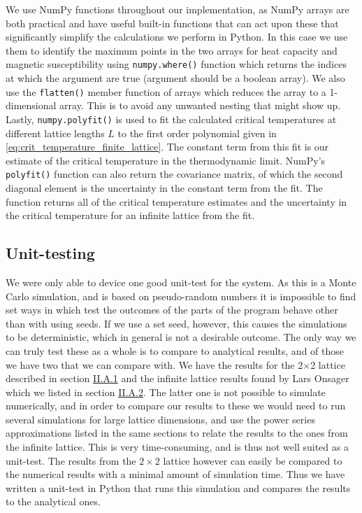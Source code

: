 \documentclass[reprint,english,notitlepage]{revtex4-1}  %
\begin{document}
We use NumPy \citep{numpy} functions throughout our implementation, as NumPy arrays are both practical and have useful built-in functions that can act upon these that significantly simplify the calculations we perform in Python. In this case we use them to identify the maximum points in the two arrays for heat capacity and magnetic susceptibility using \verb+numpy.where()+ function which returns the indices at which the argument are true (argument should be a boolean array). We also use the \verb+flatten()+ member function of arrays which reduces the array to a 1-dimensional array. This is to avoid any unwanted nesting that might show up. Lastly, \verb+numpy.polyfit()+ is used to fit the calculated critical temperatures at different lattice lengths $L$ to the first order polynomial given in \eqref{eq:crit_temperature_finite_lattice}. The constant term from this fit is our estimate of the critical temperature in the thermodynamic limit. NumPy's \verb+polyfit()+ function can also return the covariance matrix, of which the second diagonal element is the uncertainty in the constant term from the fit. The function returns all of the critical temperature estimates and the uncertainty in the critical temperature for an infinite lattice from the fit.


\subsection{Unit-testing} \label{sec:III:B}

We were only able to device one good unit-test for the system. As this is a Monte Carlo simulation, and is based on pseudo-random numbers it is impossible to find set ways in which test the outcomes of the parts of the program behave other than with using seeds. If we use a set seed, however, this causes the simulations to be deterministic, which in general is not a desirable outcome. The only way we can truly test these as a whole is to compare to analytical results, and of those we have two that we can compare with. We have the results for the 2$\times$2 lattice described in section \hyperref[sec:II.A.i]{II.A.1} and the infinite lattice results found by Lars Onsager \citep{L.Onsager1944} which we listed in section \hyperref[sec:II.A.ii]{II.A.2}. The latter one is not possible to simulate numerically, and in order to compare our results to these we would need to run several simulations for large lattice dimensions, and use the power series approximations listed in the same sections to relate the results to the ones from the infinite lattice. This is very time-consuming, and is thus not well suited as a unit-test. The results from the $2\times2$ lattice however can easily be compared to the numerical results with a minimal amount of simulation time. Thus we have written a unit-test in Python that runs this simulation and compares the results to the analytical ones.     
\end{document}

